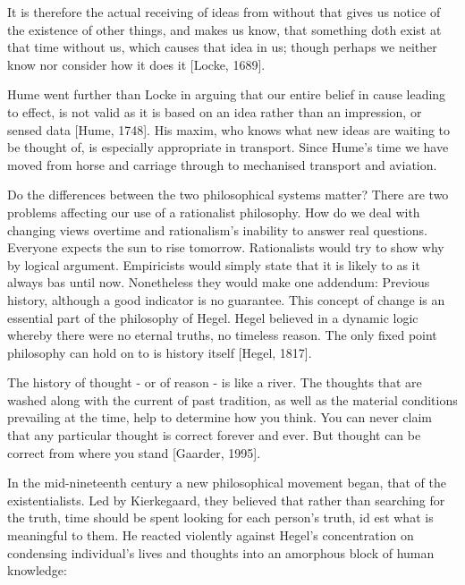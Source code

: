 \begin{displayquote}
It is therefore the actual receiving of ideas from without that gives us notice of the existence of other things, and makes us know, that something doth exist at that time without us, which causes that idea in us; though perhaps we neither know nor consider how it does it [Locke, 1689].
\end{displayquote}

Hume went further than Locke in arguing that our entire belief in cause leading to effect, is not valid as it is based on an idea rather than an impression, or sensed data [Hume, 1748]. His maxim, who knows what new ideas are waiting to be thought of, is especially appropriate in transport. Since Hume's time we have moved from horse and carriage through to mechanised transport and aviation.

Do the differences between the two philosophical systems matter? There are two problems affecting our use of a rationalist philosophy. How do we deal with changing views overtime and rationalism's inability to answer real questions. Everyone expects the sun to rise tomorrow. Rationalists would try to show why by logical argument. Empiricists would simply state that it is likely to as it always bas until now. Nonetheless they would make one addendum: Previous history, although a good indicator is no guarantee. This concept of change is an essential part of the philosophy of Hegel. Hegel believed in a dynamic logic whereby there were no eternal truths, no timeless reason. The only fixed point philosophy can hold on to is history itself [Hegel, 1817].

\begin{displayquote}
The history of thought - or of reason - is like a river. The thoughts that are washed along with the current of past tradition, as well as the material conditions prevailing at the time, help to determine how you think. You can never claim that any particular thought is correct forever and ever. But thought can be correct from where you stand [Gaarder, 1995].
\end{displayquote}

In the mid-nineteenth century a new philosophical movement began, that of the existentialists. Led by Kierkegaard, they believed that rather than searching for the truth, time should be spent looking for each person's truth, id est what is meaningful to them. He reacted violently against Hegel's concentration on condensing individual's lives and thoughts into an amorphous block of human knowledge:

